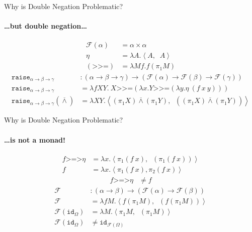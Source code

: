 \documentclass{beamer}
\newcommand{\dand}{\mathbin{\overline{\land}}}
\newcommand{\dnot}{\mathop{\overline{\lnot}}}
\newcommand{\hsbind}{\mathbin{\texttt{>>=}}}
\newcommand{\kleislicomp}{\mathbin{\texttt{>=>}}}
\begin{document}
\begin{frame}{Why is Double Negation Problematic?}
  \framesubtitle{\ldots but double negation\ldots}
  
  \begin{align*}
    \mathcal{F}(\alpha) &= \alpha \times \alpha \\
    \eta &= \lambda A. \left< A, \dnot A \right> \\
    (\hsbind) &= \lambda M f. f (\pi_1 M)
  \end{align*}
  \vfill
  \pause
  \begin{align*}
    \texttt{raise}_{\alpha \to \beta \to \gamma} &: (\alpha \to \beta \to \gamma) \to (\mathcal{F}(\alpha) \to \mathcal{F}(\beta) \to \mathcal{F}(\gamma)) \\
    \texttt{raise}_{\alpha \to \beta \to \gamma} &= \lambda f X Y.\ X \hsbind (\lambda x. Y \hsbind (\lambda y. \eta\ (f\ x\ y))) \\
    \texttt{raise}_{\alpha \to \beta \to \gamma}(\dand) &= \lambda X Y. \left< (\pi_1X) \dand (\pi_1Y), \dnot ((\pi_1 X) \dand (\pi_1 Y)) \right>
  \end{align*}
\end{frame}

\begin{frame}{Why is Double Negation Problematic?}
  \framesubtitle{\ldots is not a monad!}

  \begin{align*}
    f \kleislicomp \eta &= \lambda x. \left< \pi_1 (f\ x), \dnot (\pi_1 (f
    \ x))\right> \\
    f &= \lambda x. \left< \pi_1 (f\ x), \pi_2 (f\ x) \right>
  \end{align*}
  \vfill
  \pause
  \begin{align*}
    f \kleislicomp \eta &\neq f
  \end{align*}
  \vfill
  \pause
  \begin{align*}
    \mathcal{F} &: (\alpha \to \beta) \to (\mathcal{F}(\alpha) \to \mathcal{F}(\beta)) \\
    \mathcal{F} &= \lambda f M. \left< f (\pi_1 M), \dnot (f (\pi_1 M)) \right> \\
    \mathcal{F}(\texttt{id}_{\Omega}) &= \lambda M. \left< \pi_1 M, \dnot (\pi_1 M) \right> \\
    \mathcal{F}(\texttt{id}_{\Omega}) &\neq \texttt{id}_{\mathcal{F}(\Omega)}
  \end{align*}
\end{frame}
\end{document}

